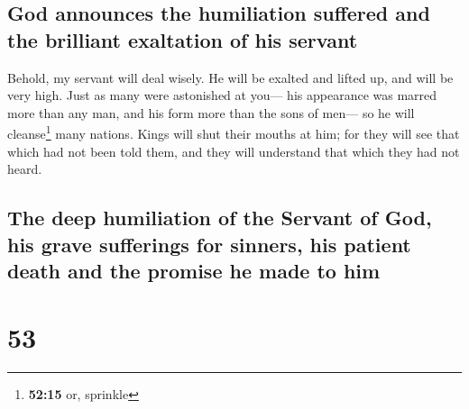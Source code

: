 \hypertarget{god-announces-the-humiliation-suffered-and-the-brilliant-exaltation-of-his-servant}{%
\subsection{God announces the humiliation suffered and the brilliant
exaltation of his
servant}\label{god-announces-the-humiliation-suffered-and-the-brilliant-exaltation-of-his-servant}}

 Behold, my servant will deal wisely. He will be exalted
and lifted up, and will be very high.  Just as many were
astonished at you--- his appearance was marred more than any man, and
his form more than the sons of men---  so he will
cleanse\footnote{\textbf{52:15} or, sprinkle} many nations. Kings will
shut their mouths at him; for they will see that which had not been told
them, and they will understand that which they had not heard.

\hypertarget{the-deep-humiliation-of-the-servant-of-god-his-grave-sufferings-for-sinners-his-patient-death-and-the-promise-he-made-to-him}{%
\subsection{The deep humiliation of the Servant of God, his grave
sufferings for sinners, his patient death and the promise he made to
him}\label{the-deep-humiliation-of-the-servant-of-god-his-grave-sufferings-for-sinners-his-patient-death-and-the-promise-he-made-to-him}}

\hypertarget{section-52}{%
\section{53}\label{section-52}}

